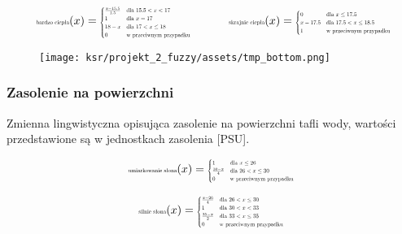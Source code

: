 \documentclass{article}
\begin{document}
\begin{equation*}
\begin{minipage}{0.5\textwidth}
\centering
$\text{\scalebox{0.5}{bardzo ciepła}}(x) = 
\scalebox{0.5}{$
\begin{cases} 
\frac{x - 15.5}{1.5} & \text{dla } 15.5 < x < 17 \\
1 & \text{dla } x = 17 \\
18 - x & \text{dla } 17 < x \leq 18 \\
0 & \text{w przeciwnym przypadku}
\end{cases}
$}$
\end{minipage}%
\begin{minipage}{0.5\textwidth}
\centering
$\text{\scalebox{0.5}{skrajnie ciepła}}(x) = 
\scalebox{0.5}{$
\begin{cases} 
0 & \text{dla } x \leq 17.5 \\
x - 17.5 & \text{dla } 17.5 < x \leq 18.5 \\
1 & \text{w przeciwnym przypadku}
\end{cases}
$}$
\end{minipage}
\end{equation*}



\begin{figure}[H]
\centering
\texttt{[image: ksr/projekt\_2\_fuzzy/assets/tmp\_bottom.png]}
\label{fig:epsilon_bat}
\end{figure}

\subsubsection{Zasolenie na powierzchni}

\noindent Zmienna lingwistyczna opisująca zasolenie na powierzchni tafli wody, wartości przedstawione są w jednostkach zasolenia [PSU].

\begin{equation*}
\text{\scalebox{0.5}{umiarkowanie słona}}(x) = 
\scalebox{0.5}{$
\begin{cases} 
1 & \text{dla } x \leq 26 \\
\frac{30 - x}{4} & \text{dla } 26 < x \leq 30 \\
0 & \text{w przeciwnym przypadku}
\end{cases}
$}
\end{equation*}

\begin{equation*}
\text{\scalebox{0.5}{silnie słona}}(x) = 
\scalebox{0.5}{$
\begin{cases} 
\frac{x - 26}{4} & \text{dla } 26 < x \leq 30 \\
1 & \text{dla } 30 < x < 33 \\
\frac{35 - x}{2} & \text{dla } 33 < x \leq 35 \\
0 & \text{w przeciwnym przypadku}
\end{cases}
$}
\end{equation*}
\end{document}
